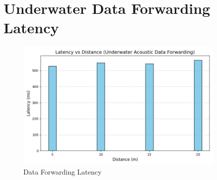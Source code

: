 \documentclass[]{nsm-thesis}
\begin{document}
\section{Underwater Data Forwarding Latency}
\vspace{3cm}
\begin{figure}[h!]
    \centering
    \includegraphics[width=0.9\textwidth]{image/Figure_1.png}
    \caption{Data Forwarding Latency}
    \label{fig:rtt_extended_aodv}
\end{figure}
\cleardoublepage
\end{document}
